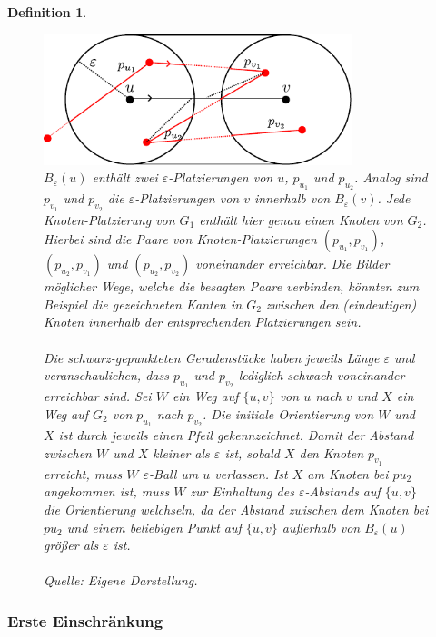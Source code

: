 \documentclass[a4paper, 12pt, twoside]{article}
\theoremstyle{Format1} %
\newtheorem{Def}{Definition}[section]       %
\begin{document}
\begin{Def}
	\begin{figure}[H]
	    \centering
	    \includegraphics[width=0.8\textwidth]{chapter_3_placements_example.pdf}
		\caption{$B_{\varepsilon}(u)$ enthält zwei $\varepsilon$-Platzierungen von $u$, $p_{u_1}$ und $p_{u_2}$. Analog sind $p_{v_1}$ und $p_{v_2}$
		die $\varepsilon$-Platzierungen von $v$ innerhalb von $B_{\varepsilon}(v)$. Jede Knoten-Platzierung von $G_1$ enthält hier genau einen Knoten von $G_2$.
		Hierbei sind die Paare von Knoten-Platzierungen
		$(p_{u_1},p_{v_1})$, $(p_{u_2},p_{v_1})$ und $(p_{u_2},p_{v_2})$ voneinander erreichbar. Die Bilder möglicher Wege, welche die besagten Paare verbinden, könnten zum Beispiel die
		gezeichneten Kanten in $G_2$ zwischen den (eindeutigen) Knoten innerhalb der entsprechenden Platzierungen sein.
		\\
		\\
		Die schwarz-gepunkteten Geradenstücke haben jeweils Länge $\varepsilon$ und veranschaulichen, dass $p_{u_1}$ und $p_{v_2}$ lediglich schwach voneinander erreichbar sind.
		Sei $W$ ein Weg auf $\{u,v\}$ von $u$ nach $v$ und $X$ ein Weg auf $G_2$ von $p_{u_1}$ nach $p_{v_2}$. Die initiale Orientierung von $W$ und $X$ ist durch jeweils einen Pfeil gekennzeichnet.
		Damit der Abstand zwischen $W$ und $X$ kleiner als $\varepsilon$ ist, sobald $X$ den Knoten $p_{v_1}$ erreicht,
		muss $W$ $\varepsilon$-Ball um $u$ verlassen. Ist $X$ am Knoten bei $p{u_2}$ angekommen ist, muss $W$ zur Einhaltung des $\varepsilon$-Abstands auf $\{u,v\}$ die Orientierung welchseln, da
		der Abstand zwischen dem Knoten bei $p{u_2}$ und einem beliebigen Punkt auf $\{u,v\}$ außerhalb von $B_{\varepsilon}(u)$ größer als $\varepsilon$ ist.
		\\
		\\
		Quelle: Eigene Darstellung.
		}
	    \label{chapter_3_placements_example}
	\end{figure}

\end{Def}

\subsubsection{Erste Einschränkung} \label{Erste Einschränkung}
\end{document}
